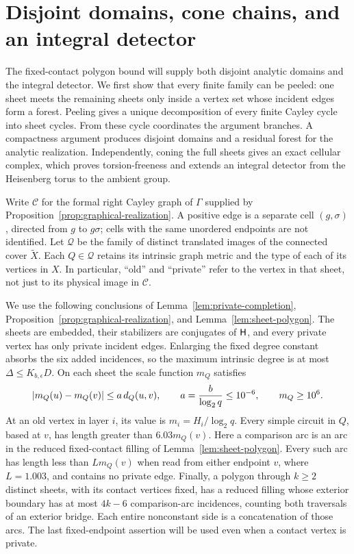 \section{Disjoint domains, cone chains, and an integral detector}
\label{sec:domains}

The fixed-contact polygon bound will supply both disjoint analytic domains
and the integral detector.  We first show that every finite family can be
peeled: one sheet
meets the remaining sheets only inside a vertex set whose incident edges
form a forest.  Peeling gives a unique decomposition of every finite Cayley
cycle into sheet cycles.  From these cycle coordinates the argument
branches.  A compactness argument produces disjoint domains and a residual
forest for the analytic realization.  Independently, coning the full sheets
gives an exact cellular complex, which proves torsion-freeness and extends
an integral detector from the Heisenberg torus to the ambient group.

Write $\mathcal C$ for the formal right Cayley graph of $\Gamma$ supplied by
Proposition~\ref{prop:graphical-realization}.  A positive edge is a separate
cell $(g,\sigma)$, directed from $g$ to $g\sigma$; cells with the same unordered
endpoints are not identified.  Let $\mathcal Q$ be the family of distinct
translated images of the connected cover $\widetilde X$.  Each $Q\in\mathcal Q$
retains its intrinsic graph metric and the type of each of its vertices in
$X$.  In particular, ``old'' and ``private'' refer to the vertex in that
sheet, not just to its physical image in $\mathcal C$.

We use the following conclusions of
Lemma~\ref{lem:private-completion},
Proposition~\ref{prop:graphical-realization}, and
Lemma~\ref{lem:sheet-polygon}.  The sheets are embedded, their stabilizers
are conjugates of $\mathsf H$, and every private vertex has only private incident
edges.  Enlarging the fixed degree constant absorbs the six added
incidences, so the maximum intrinsic degree is at most
$\Delta\leq K_{b,\epsilon}D$.  On each sheet the scale function $m_Q$ satisfies
\begin{equation}
 \left\lvert m_Q(u)-m_Q(v)\right\rvert\leq a\,d_Q(u,v),\qquad
 a=\frac{b}{\log_2q}\leq10^{-6},\qquad m_Q\geq10^6.
 \label{eq:domain-scale}
\end{equation}
At an old vertex in layer $i$, its value is $m_i=H_i/\log_2q$.
Every simple circuit in $Q$, based at $v$, has length greater than
$6.03m_Q(v)$.  Here a comparison arc is an arc in the reduced
fixed-contact filling of Lemma~\ref{lem:sheet-polygon}.  Every such arc
has length less than
$L m_Q(v)$ when read from either endpoint $v$, where $L=1.003$, and contains
no private edge.  Finally, a polygon through $k\geq2$ distinct sheets,
with its contact vertices fixed, has a reduced filling whose exterior
boundary has at most $4k-6$ comparison-arc incidences, counting both
traversals of an exterior bridge.  Each entire nonconstant side is a
concatenation of those arcs.  The last fixed-endpoint assertion will be
used even when a contact vertex is private.

